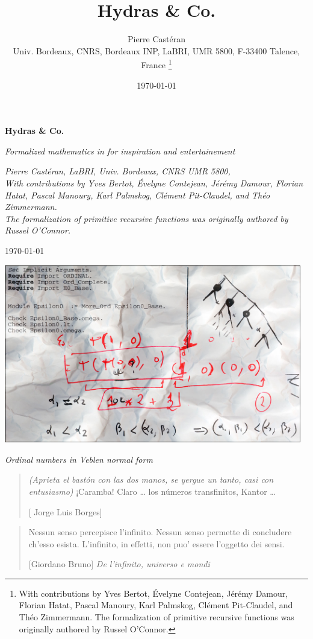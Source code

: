 \documentclass[twoside,a4paper]{book}
\author{Pierre Castéran\\ Univ. Bordeaux, CNRS, Bordeaux INP, LaBRI, UMR 5800, F-33400 Talence, France \thanks{With contributions by Yves Bertot, \'Evelyne Contejean,  Jérémy Damour, Florian Hatat, Pascal Manoury, Karl Palmskog, Clément Pit-Claudel, and Théo Zimmermann. The formalization of primitive recursive functions was originally authored by 
Russel O'Connor\cite{OConnor05}.}}
\date{\today}
\title{Hydras \& Co.}
\begin{document}
\begin{titlepage}
   \begin{center}
       \vspace*{1cm}

       \textbf{\Huge Hydras \& Co.}

       \vspace{0.5cm}
        {\emph{\Large Formalized mathematics in \coq for inspiration and entertainement}}
            
       \vspace{1.5cm}

       \emph{Pierre Castéran, LaBRI, Univ. Bordeaux, CNRS UMR 5800, \\ With contributions by Yves Bertot, \'Evelyne Contejean,  Jérémy Damour, Florian Hatat, Pascal Manoury, Karl Palmskog, Clément Pit-Claudel, and Théo Zimmermann. \\ The formalization of primitive recursive functions was originally authored by Russel O'Connor.}%

 \vfill
        \today 
   
    
            
      \end{center}
\vfill
      \centering
      \includegraphics[width=13cm]{epsilon0.jpg}
      \centerline{\emph{\small {\color{darkblue}Ordinal numbers in Veblen normal form}}}
\end{titlepage}


\clearpage
\newpage
\thispagestyle{empty}
\mbox{}
\newpage
\newpage
\begin{quote}
 \emph{(Aprieta el bast\'on con las dos manos, se yergue un tanto,
casi con entusiasmo)} ¡Caramba! Claro \dots{} los n\'umeros
transfinitos, Kantor \dots{}

[ Jorge Luis Borges]
\end{quote}
\vspace{2cm}
\begin{quote}
  Nessun senso percepisce l'infinito. Nessun senso permette di concludere ch'esso esista. L'infinito, in effetti, non puo' essere l'oggetto dei sensi.

  [Giordano Bruno] \emph{De l'infinito, universo e mondi}
\end{quote}
\end{document}
